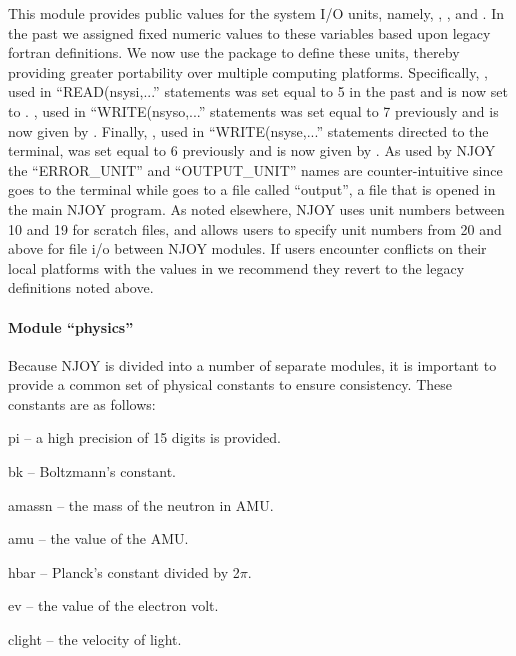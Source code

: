 This module provides public values for the system I/O units, namely,
, , and .
In the past we
assigned fixed numeric values to these variables based upon legacy
fortran definitions.  We now use the  package
to define these units, thereby providing greater portability over
multiple computing platforms.  Specifically, , used in
``READ(nsysi,...'' statements was set equal to 5 in the past and is
now set to .  , used in
``WRITE(nsyso,...'' statements was set equal to 7 previously and is
now given by .  Finally, , used
in ``WRITE(nsyse,...'' statements directed to the terminal, was
set equal to 6 previously and is now given by
.  As used by NJOY the ``ERROR\_UNIT'' and
``OUTPUT\_UNIT'' names are counter-intuitive since
 goes to the terminal while
 goes to a file called ``output'', a file that is
opened in the main NJOY program.  As noted elsewhere, NJOY uses
unit numbers between 10 and 19 for scratch files, and allows
users to specify unit numbers from 20 and above for file i/o
between NJOY modules.  If users encounter conflicts on their local
platforms with the values in  we recommend
they revert to the legacy definitions noted above.


\paragraph{Module ``physics''}

Because NJOY is divided into a number of separate modules, it is
important to provide a common set of physical constants to ensure
consistency.  These constants are as follows:

\begin{description}
\begin{singlespace}
\item[pi --] a high precision of 15 digits is provided.

\item[bk --] Boltzmann's constant.

\item[amassn --] the mass of the neutron in AMU.

\item[amu --] the value of the AMU.

\item[hbar --] Planck's constant divided by 2$\pi$.

\item[ev --] the value of the electron volt.

\item[clight --] the velocity of light.
\end{singlespace}
\end{description}

